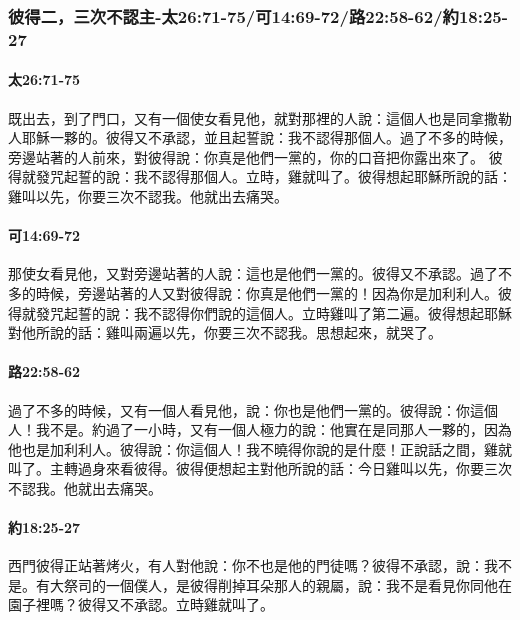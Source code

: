 \subsubsection{彼得二，三次不認主-太26:71-75/可14:69-72/路22:58-62/約18:25-27}
\paragraph{太26:71-75}
既出去，到了門口，又有一個使女看見他，就對那裡的人說：這個人也是同拿撒勒人耶穌一夥的。彼得又不承認，並且起誓說：我不認得那個人。過了不多的時候，旁邊站著的人前來，對彼得說：你真是他們一黨的，你的口音把你露出來了。
彼得就發咒起誓的說：我不認得那個人。立時，雞就叫了。彼得想起耶穌所說的話：雞叫以先，你要三次不認我。他就出去痛哭。

\paragraph{可14:69-72}
那使女看見他，又對旁邊站著的人說：這也是他們一黨的。彼得又不承認。過了不多的時候，旁邊站著的人又對彼得說：你真是他們一黨的！因為你是加利利人。彼得就發咒起誓的說：我不認得你們說的這個人。立時雞叫了第二遍。彼得想起耶穌對他所說的話：雞叫兩遍以先，你要三次不認我。思想起來，就哭了。

\paragraph{路22:58-62}
過了不多的時候，又有一個人看見他，說：你也是他們一黨的。彼得說：你這個人！我不是。約過了一小時，又有一個人極力的說：他實在是同那人一夥的，因為他也是加利利人。彼得說：你這個人！我不曉得你說的是什麼！正說話之間，雞就叫了。主轉過身來看彼得。彼得便想起主對他所說的話：今日雞叫以先，你要三次不認我。他就出去痛哭。

\paragraph{約18:25-27}
西門彼得正站著烤火，有人對他說：你不也是他的門徒嗎？彼得不承認，說：我不是。有大祭司的一個僕人，是彼得削掉耳朵那人的親屬，說：我不是看見你同他在園子裡嗎？彼得又不承認。立時雞就叫了。

